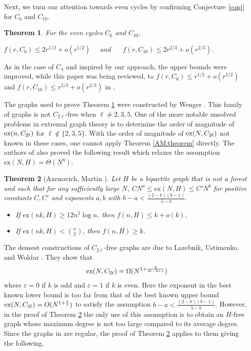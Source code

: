 \documentclass[12pt]{article}%
\newtheorem{theorem}{Theorem}[section]
\begin{document}
Next, we turn our attention towards even cycles by confirming 
Conjecture \ref{conj} for $C_6$ and $C_{10}$.  

\begin{theorem}\label{theorem:cycles}
For the even cycles $C_6$ and $C_{10}$, 
\begin{center}
	$f( r, C_6) \leq 2 r^{1/2} + o ( r^{1/2} ) $~~ and ~~
 $f(r,C_{10}) \leq 2 r^{2/3}  + o( r^{2/3})$.
	\end{center}
\end{theorem}

As in the case of $C_4$ and inspired by our approach, the upper bounds were improved, while this paper was being reviewed, to 
$f(r , C_6) \leq r^{1/2}+ o(r^{1/2}) $ and
$f(r,C_{10} ) \leq r^{2/3} + o(r^{2/3})$ in \cite{Taranchuk2024}.  

The graphs used to prove Theorem \ref{theorem:cycles} were constructed by Wenger \cite{Wenger}.  This family of graphs is not $C_{ 2 \ell}$-free when $\ell \neq 2,3,5$.  
One of the more notable unsolved problems 
in extremal graph theory is to determine the order of magnitude of 
$\textup{ex}(n, C_{ 2 \ell } )$ for $\ell \notin \{2,3,5 \}$.  
With the order of magnitude of $\textup{ex}(N,C_{ 2 \ell } )$ not known in these cases, one cannot apply Theorem \ref{AM:theorem} directly. The authors of \cite{AxeMartin} also proved the following result which relaxes the assumption $\mathrm{ex}(N,H)=\Theta(N^\eta)$.

\begin{theorem}[Axenovich, Martin \cite{AxeMartin}] \label{AM general theorem}
Let $H$ be a bipartite graph that is not a forest and such that for any sufficiently large $N$, $CN^a\le \mathrm{ex}(N,H)\le C'N^b$ for positive constants $C,C'$ and exponents $a,b$ with $b-a<\frac{(2-b)(b-1)}{5-b}.$
\begin{itemize}
    \item If $\mathrm{ex}(nk,H)\ge 12n^2\log n$, then $f(n,H)\le k+o(k)$.
    \item If $\mathrm{ex}(nk,H)<{n\choose 2}$, then $f(n,H)\ge k$.
\end{itemize}
\end{theorem}

The densest constructions of $C_{2\ell}$-free graphs are due to Lazebnik, Ustimenko, and Woldar \cite{LUW}.  They show that
$$\textup{ex}(N,C_{2\ell})=\Omega(N^{1+\frac{2}{3\ell-3+\varepsilon}})$$
where $\varepsilon=0$ if $k$ is odd and $\varepsilon=1$ if $k$ is even. Here the exponent in the best known lower bound is too far from that of the best known upper bound $\textup{ex}(N,C_{2\ell})=O(N^{1+\frac{1}{\ell}})$ to satisfy the assumption $b-a<\frac{(2-b)(b-1)}{5-b}.$ However, in the proof of Theorem \ref{AM general theorem} the only use of this assumption is to obtain an $H$-free graph whose maximum degree is not too large compared to its average degree. Since the graphs in \cite{LUW} are regular, the proof of Theorem \ref{AM general theorem} applies to them giving the following.
\end{document}
